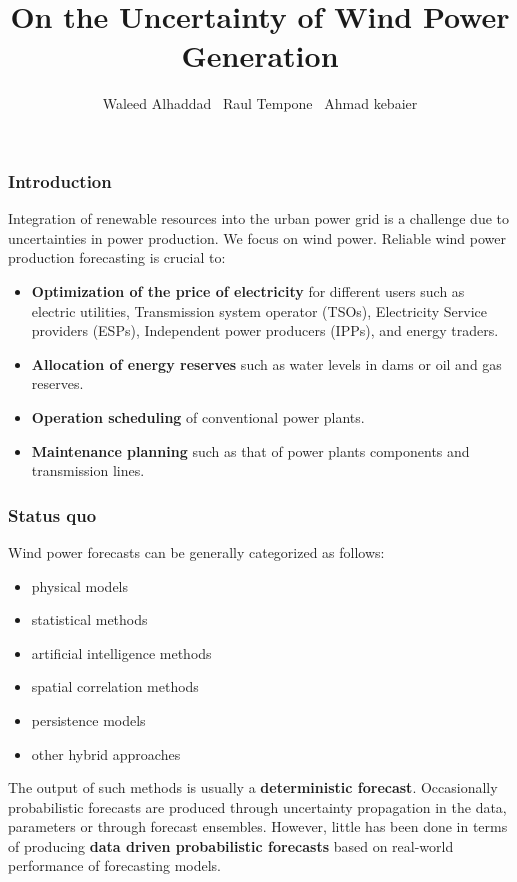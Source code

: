 \documentclass[aspectratio=169]{beamer}\usepackage[utf8]{inputenc}
\title{On the Uncertainty of Wind Power Generation}
\subtitle{ Waleed Alhaddad \ Raul Tempone \ Ahmad kebaier }
\begin{document}


\begin{frame}
\titlepage
\end{frame}

\begin{frame}[label=guide]\frametitle{ Introduction }
Integration of renewable resources into the urban power grid is a challenge due to uncertainties in power production. We focus on wind power. Reliable wind power production forecasting is crucial to:
\begin{itemize}
\item \textbf{Optimization of the price of electricity} for different users such as electric utilities, Transmission system operator (TSOs), Electricity Service providers (ESPs), Independent power producers (IPPs), and energy traders.
\item \textbf{Allocation of energy reserves} such as water levels in dams or oil and gas reserves.
\item \textbf{Operation scheduling} of conventional power plants.
\item \textbf{Maintenance planning} such as that of power plants components and transmission lines.
\end{itemize}

\end{frame}

\begin{frame}\frametitle{Status quo }
  Wind power forecasts can be generally categorized as follows:
  \begin{itemize}
    \item physical models
    \item statistical methods
    \item artificial intelligence methods
    \item spatial correlation methods
    \item persistence models
    \item other hybrid approaches
  \end{itemize}
 The output of such methods is usually a \textbf{deterministic forecast}. Occasionally probabilistic forecasts are produced through uncertainty propagation in the data, parameters or through forecast ensembles. However, little has been done in terms of producing \textbf{data driven probabilistic forecasts} based on real-world performance of forecasting models.
\end{frame}
\end{document}
